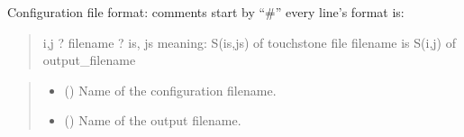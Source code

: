 \documentclass[letterpaper,10pt,english]{sphinxmanual}
\begin{document}
\begin{fulllineitems}
\label{\detokenize{touchstone:touchstone.generate_multiport_spfile}}
\pysigstartsignatures
{}
\pysigstopsignatures
\sphinxAtStartPar
Configuration file format:
\sphinxhyphen{} comments start by “\#”
\sphinxhyphen{} every line’s format is:
\begin{quote}

\sphinxAtStartPar
i,j ? filename ? is, js
meaning:
S(is,js) of touchstone file filename is S(i,j) of output\_filename
\end{quote}
\begin{quote}\begin{description}
\begin{itemize}
\item {} 
\sphinxAtStartPar
{} () \textendash{} Name of the configuration filename.

\item {} 
\sphinxAtStartPar
{} () \textendash{} Name of the output filename.

\end{itemize}

\end{description}\end{quote}

\end{fulllineitems}


\begin{fulllineitems}
\label{\detokenize{touchstone:touchstone.parse_format}}
\pysigstartsignatures
{}
\pysigstopsignatures
\end{fulllineitems}

\end{document}
